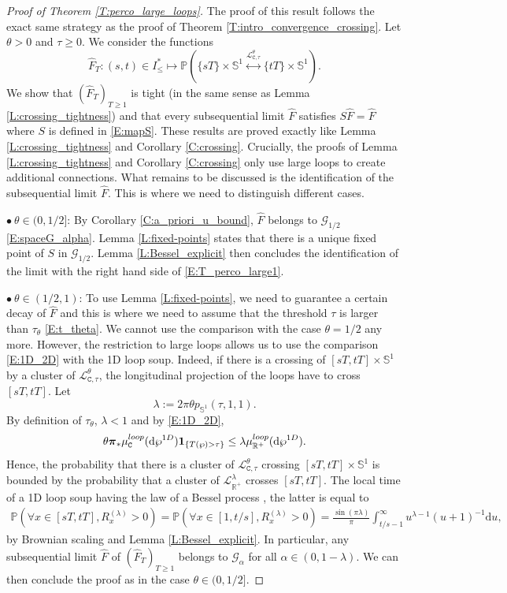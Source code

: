 \documentclass[11pt]{article}
\theoremstyle{remark}
\newcommand{\R}{\mathbb{R}}
\newcommand{\Gc}{\mathcal{G}}
\newcommand{\Lc}{\mathcal{L}}
\newcommand{\Prob}[1]{\mathbb{P} \left( #1 \right) }
\newcommand{\indic}[1]{ \mathbf{1}_{ \left\{ #1 \right\} } }
\renewcommand{\d}{\mathrm{d}}
\newcommand{\cyl}{\mathtt{C}}
\def \loopmeasure{\mu^{\rm loop}}
\numberwithin{equation}{section}
\begin{document}
\begin{proof}[Proof of Theorem \ref{T:perco_large_loops}]
The proof of this result follows the exact same strategy as the proof of Theorem \ref{T:intro_convergence_crossing}. Let $\theta >0$ and $\tau \geq 0$. We consider the functions
\[
\hat{F}_T : (s,t) \in I_\leq^* \mapsto \Prob{ \{s T\} \times \mathbb{S}^1 \overset{\Lc_{\cyl,\tau}^\theta}{\longleftrightarrow} \{ t T \} \times \mathbb{S}^1 }.
\]
We show that $(\hat{F}_T)_{T \geq 1}$ is tight (in the same sense as Lemma \ref{L:crossing_tightness}) and that every subsequential limit $\hat{F}$ satisfies $S \hat{F} = \hat{F}$ where $S$ is defined in \eqref{E:mapS}.
These results are proved exactly like Lemma \ref{L:crossing_tightness} and Corollary \ref{C:crossing}. Crucially, the proofs of Lemma \ref{L:crossing_tightness} and Corollary \ref{C:crossing} only use large loops to create additional connections.
What remains to be discussed is the identification of the subsequential limit $\hat{F}$. This is where we need to distinguish different cases.

$\bullet~ \theta \in (0,1/2]$: By Corollary \ref{C:a_priori_u_bound}, $\hat{F}$ belongs to $\Gc_{1/2}$ \eqref{E:spaceG_alpha}. Lemma \ref{L:fixed-points} states that there is a unique fixed point of $S$ in $\Gc_{1/2}$. Lemma \ref{L:Bessel_explicit} then concludes the identification of the limit with the right hand side of \eqref{E:T_perco_large1}.

$\bullet~ \theta \in (1/2,1)$: To use Lemma \ref{L:fixed-points}, we need to guarantee a certain decay of $\hat{F}$ and this is where we need to assume that the threshold $\tau$ is larger than $\tau_\theta$ \eqref{E:t_theta}. We cannot use the comparison with the case $\theta = 1/2$ any more. However, the restriction to large loops allows us to use the comparison \eqref{E:1D_2D} with the 1D loop soup. Indeed, if there is a crossing of $[sT, tT] \times \mathbb{S}^1$ by a cluster of $\Lc_{\cyl,\tau}^\theta$, the longitudinal projection of the loops have to cross $[sT,tT]$. Let
\[
\lambda :=
2\pi \theta p_{\mathbb{S}^1}(\tau,1,1).
\]
By definition of $\tau_\theta$, $\lambda < 1$ and by \eqref{E:1D_2D},
\[
\theta \boldsymbol{\pi}_* \loopmeasure_\cyl(\d \wp^{\rm 1D}) \indic{T(\wp) > \tau} \leq \lambda \loopmeasure_{\R^+}(\d \wp^{\rm 1D}).
\]
Hence, the probability that there is a cluster of $\Lc_{\cyl,\tau}^\theta$ crossing $[sT, tT] \times \mathbb{S}^1$ is bounded by the probability that a cluster of $\Lc_{\R^+}^\lambda$ crosses $[sT,tT]$. The local time of a 1D loop soup having the law of a Bessel process \cite{Lupu18}, the latter is equal to
\begin{align*}
\Prob{ \forall x \in [sT, tT], R^{(\lambda)}_x > 0}
= \Prob{ \forall x \in [1,t/s], R^{(\lambda)}_x > 0}
= \frac{\sin(\pi \lambda)}{\pi} \int_{t/s-1}^\infty u^{\lambda-1} (u+1)^{-1} \d u,
\end{align*}
by Brownian scaling and Lemma \ref{L:Bessel_explicit}. In particular, any subsequential limit $\hat{F}$ of $(\hat{F}_T)_{T \geq 1}$ belongs to $\Gc_{\alpha}$ for all $\alpha \in (0,1-\lambda)$. We can then conclude the proof as in the case $\theta \in (0,1/2]$.


\end{proof}
\end{document}
